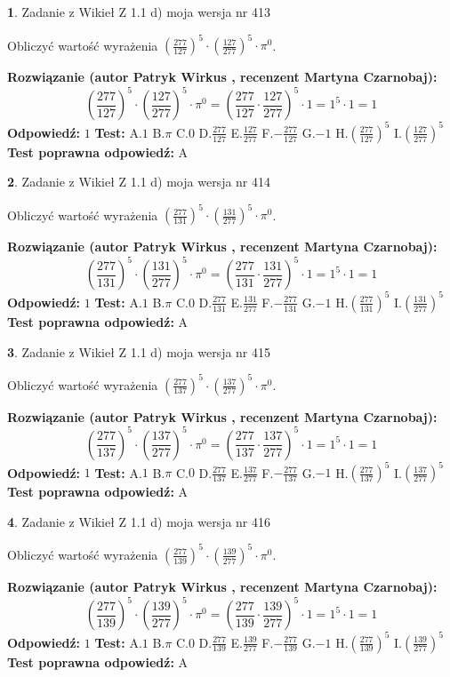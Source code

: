 \documentclass[12pt, a4paper]{article}
\theoremstyle{definition} %
\newtheorem{zad}{}
\newcommand{\zadStart}[1]{\begin{zad}#1\newline}
\newcommand{\zadStop}{\end{zad}}
\newcommand{\rozwStart}[2]{\noindent \textbf{Rozwiązanie (autor #1 , recenzent #2): }\newline}
\newcommand{\rozwStop}{\newline}
\newcommand{\odpStart}{\noindent \textbf{Odpowiedź:}\newline}
\newcommand{\odpStop}{\newline}
\newcommand{\testStart}{\noindent \textbf{Test:}\newline}
\newcommand{\testStop}{\newline}
\newcommand{\kluczStart}{\noindent \textbf{Test poprawna odpowiedź:}\newline}
\newcommand{\kluczStop}{\newline}
\begin{document}
\zadStart{Zadanie z Wikieł Z 1.1 d) moja wersja nr 413}

Obliczyć wartość wyrażenia $(\frac{277}{127})^{5} \cdot (\frac{127}{277})^{5} \cdot \pi^{0}$.
\zadStop
\rozwStart{Patryk Wirkus}{Martyna Czarnobaj}
$$(\frac{277}{127})^{5} \cdot (\frac{127}{277})^{5} \cdot \pi^{0} = (\frac{277}{127} \cdot \frac{127}{277})^{5} \cdot 1 = 1^{5} \cdot 1 = 1$$
\rozwStop
\odpStart
$1$
\odpStop
\testStart
A.$1$ B.$\pi$ C.$0$ D.$\frac{277}{127}$ E.$\frac{127}{277}$
F.$-\frac{277}{127}$ G.$-1$
H.$(\frac{277}{127})^{5}$
I.$(\frac{127}{277})^{5}$
\testStop
\kluczStart
A
\kluczStop



\zadStart{Zadanie z Wikieł Z 1.1 d) moja wersja nr 414}

Obliczyć wartość wyrażenia $(\frac{277}{131})^{5} \cdot (\frac{131}{277})^{5} \cdot \pi^{0}$.
\zadStop
\rozwStart{Patryk Wirkus}{Martyna Czarnobaj}
$$(\frac{277}{131})^{5} \cdot (\frac{131}{277})^{5} \cdot \pi^{0} = (\frac{277}{131} \cdot \frac{131}{277})^{5} \cdot 1 = 1^{5} \cdot 1 = 1$$
\rozwStop
\odpStart
$1$
\odpStop
\testStart
A.$1$ B.$\pi$ C.$0$ D.$\frac{277}{131}$ E.$\frac{131}{277}$
F.$-\frac{277}{131}$ G.$-1$
H.$(\frac{277}{131})^{5}$
I.$(\frac{131}{277})^{5}$
\testStop
\kluczStart
A
\kluczStop



\zadStart{Zadanie z Wikieł Z 1.1 d) moja wersja nr 415}

Obliczyć wartość wyrażenia $(\frac{277}{137})^{5} \cdot (\frac{137}{277})^{5} \cdot \pi^{0}$.
\zadStop
\rozwStart{Patryk Wirkus}{Martyna Czarnobaj}
$$(\frac{277}{137})^{5} \cdot (\frac{137}{277})^{5} \cdot \pi^{0} = (\frac{277}{137} \cdot \frac{137}{277})^{5} \cdot 1 = 1^{5} \cdot 1 = 1$$
\rozwStop
\odpStart
$1$
\odpStop
\testStart
A.$1$ B.$\pi$ C.$0$ D.$\frac{277}{137}$ E.$\frac{137}{277}$
F.$-\frac{277}{137}$ G.$-1$
H.$(\frac{277}{137})^{5}$
I.$(\frac{137}{277})^{5}$
\testStop
\kluczStart
A
\kluczStop



\zadStart{Zadanie z Wikieł Z 1.1 d) moja wersja nr 416}

Obliczyć wartość wyrażenia $(\frac{277}{139})^{5} \cdot (\frac{139}{277})^{5} \cdot \pi^{0}$.
\zadStop
\rozwStart{Patryk Wirkus}{Martyna Czarnobaj}
$$(\frac{277}{139})^{5} \cdot (\frac{139}{277})^{5} \cdot \pi^{0} = (\frac{277}{139} \cdot \frac{139}{277})^{5} \cdot 1 = 1^{5} \cdot 1 = 1$$
\rozwStop
\odpStart
$1$
\odpStop
\testStart
A.$1$ B.$\pi$ C.$0$ D.$\frac{277}{139}$ E.$\frac{139}{277}$
F.$-\frac{277}{139}$ G.$-1$
H.$(\frac{277}{139})^{5}$
I.$(\frac{139}{277})^{5}$
\testStop
\kluczStart
A
\kluczStop
\end{document}
